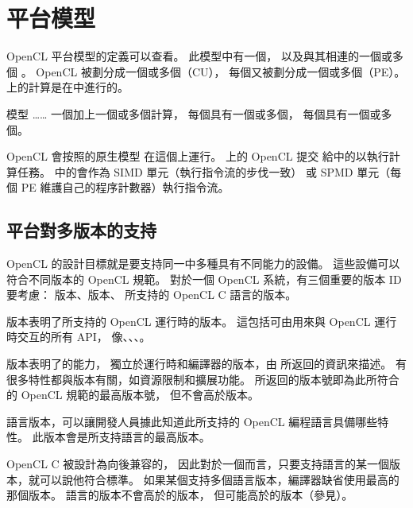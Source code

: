 \section{平台模型}

OpenCL 平台模型的定義可以查看。
此模型中有一個，
以及與其相連的一個或多個 {} 。
OpenCL 被劃分成一個或多個（CU），
每個又被劃分成一個或多個（PE）。
上的計算是在中進行的。

\startbuffer[buffigplfmodelcaption]
模型 …… 一個加上一個或多個計算，
每個具有一個或多個，
每個具有一個或多個。
\stopbuffer

{}

OpenCL 會按照的原生模型
在這個上運行。
上的 OpenCL 提交
給中的以執行計算任務。
中的會作為 SIMD 單元（執行指令流的步伐一致）
或 SPMD 單元（每個 PE 維護自己的程序計數器）執行指令流。

\subsection{平台對多版本的支持}
OpenCL 的設計目標就是要支持同一中多種具有不同能力的設備。
這些設備可以符合不同版本的 OpenCL 規範。
對於一個 OpenCL 系統，有三個重要的版本 ID 要考慮：
版本、版本、
所支持的 OpenCL C 語言的版本。

版本表明了所支持的 OpenCL 運行時的版本。
這包括可由用來與 OpenCL 運行時交互的所有 API，
像、、、。

版本表明了的能力，
獨立於運行時和編譯器的版本，由  所返回的資訊來描述。
有很多特性都與版本有關，如資源限制和擴展功能。
所返回的版本號即為此所符合的 OpenCL 規範的最高版本號，
但不會高於版本。

語言版本，可以讓開發人員據此知道此所支持的 OpenCL 編程語言具備哪些特性。
此版本會是所支持語言的最高版本。

OpenCL C 被設計為向後兼容的，
因此對於一個而言，只要支持語言的某一個版本，就可以說他符合標準。
如果某個支持多個語言版本，編譯器缺省使用最高的那個版本。
語言的版本不會高於的版本，
但可能高於的版本（參見）。

